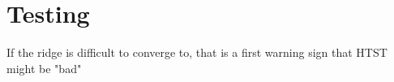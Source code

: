 \section{Testing}
\label{sec:erm-testing}

\bit
\item If the ridge is difficult to converge to, that is a first warning sign that HTST might be "bad"
\eit

\placeholder

